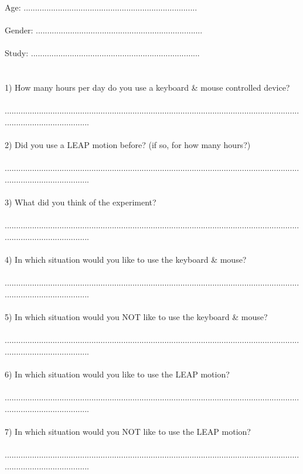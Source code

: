 \begin{appendix}
{Age: ............................................................................\\
\\
Gender: .........................................................................\\
\\
Study: ..........................................................................\\
\\
\\
1) How many hours per day do you use a keyboard \& mouse controlled device?\\
\\
......................................................................................................................................................................\\
\\
2) Did you use a LEAP motion before? (if so, for how many hours?)\\
\\
......................................................................................................................................................................\\
\\
3) What did you think of the experiment?\\
\\
......................................................................................................................................................................\\
\\
4) In which situation would you like to use the keyboard \& mouse?\\
\\
......................................................................................................................................................................\\
\\
5) In which situation would you NOT like to use the keyboard \& mouse?\\
\\
......................................................................................................................................................................\\
\\
6) In which situation would you like to use the LEAP motion?\\
\\
......................................................................................................................................................................\\
\\
7) In which situation would you NOT like to use the LEAP motion?\\
\\
......................................................................................................................................................................}
\end{appendix}
